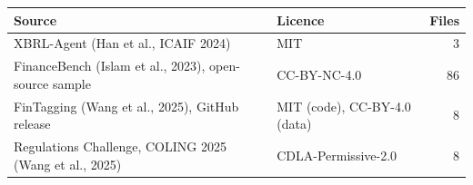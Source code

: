 \begin{tabular}{p{3.1cm}lr}
\toprule
Source & Licence & Files \\
\midrule
XBRL-Agent (Han et al., ICAIF 2024) & MIT & 3 \\
FinanceBench (Islam et al., 2023), open-source sample & CC-BY-NC-4.0 & 86 \\
FinTagging (Wang et al., 2025), GitHub release & MIT (code), CC-BY-4.0 (data) & 8 \\
Regulations Challenge, COLING 2025 (Wang et al., 2025) & CDLA-Permissive-2.0 & 8 \\
\bottomrule
\end{tabular}
